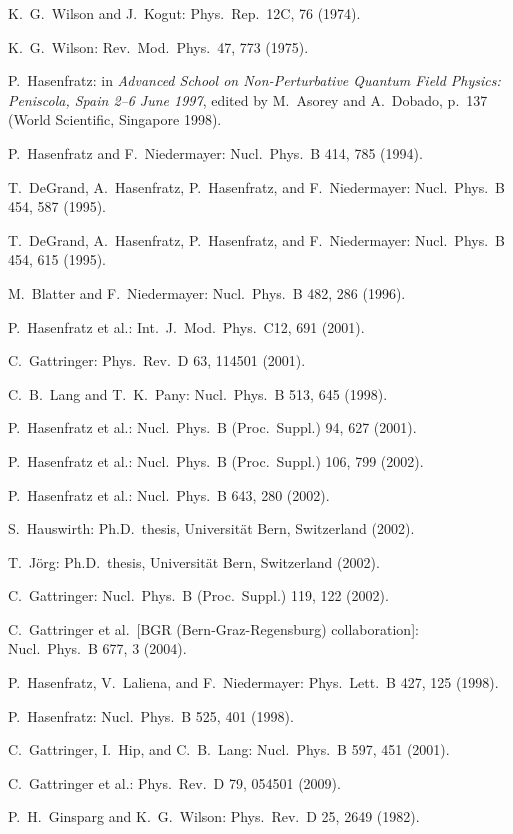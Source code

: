 \begin{enumerate}[label={[\arabic*]}]
  \item K.~G.~Wilson and J.~Kogut: Phys.\ Rep.\ 12C, 76 (1974).
  \item K.~G.~Wilson: Rev.\ Mod.\ Phys.\ 47, 773 (1975).
  \item P.~Hasenfratz: in \emph{Advanced School on Non-Perturbative Quantum
        Field Physics: Peniscola, Spain 2--6 June 1997}, edited by
        M.~Asorey and A.~Dobado, p.~137 (World Scientific, Singapore 1998).
  \item P.~Hasenfratz and F.~Niedermayer: Nucl.\ Phys.\ B 414, 785 (1994).
  \item T.~DeGrand, A.~Hasenfratz, P.~Hasenfratz, and F.~Niedermayer: Nucl.\ Phys.\ B 454, 587 (1995).
  \item T.~DeGrand, A.~Hasenfratz, P.~Hasenfratz, and F.~Niedermayer: Nucl.\ Phys.\ B 454, 615 (1995).
  \item M.~Blatter and F.~Niedermayer: Nucl.\ Phys.\ B 482, 286 (1996).
  \item P.~Hasenfratz et al.: Int.\ J.\ Mod.\ Phys.\ C12, 691 (2001).
  \item C.~Gattringer: Phys.\ Rev.\ D 63, 114501 (2001).
  \item C.~B.~Lang and T.~K.~Pany: Nucl.\ Phys.\ B 513, 645 (1998).
  \item P.~Hasenfratz et al.: Nucl.\ Phys.\ B (Proc.\ Suppl.) 94, 627 (2001).
  \item P.~Hasenfratz et al.: Nucl.\ Phys.\ B (Proc.\ Suppl.) 106, 799 (2002).
  \item P.~Hasenfratz et al.: Nucl.\ Phys.\ B 643, 280 (2002).
  \item S.~Hauswirth: Ph.D.\ thesis, Universit\"at Bern, Switzerland (2002).
  \item T.~J\"org: Ph.D.\ thesis, Universit\"at Bern, Switzerland (2002).
  \item C.~Gattringer: Nucl.\ Phys.\ B (Proc.\ Suppl.) 119, 122 (2002).
  \item C.~Gattringer et al.\ [BGR (Bern-Graz-Regensburg) collaboration]: Nucl.\ Phys.\ B 677, 3 (2004).
  \item P.~Hasenfratz, V.~Laliena, and F.~Niedermayer: Phys.\ Lett.\ B 427, 125 (1998).
  \item P.~Hasenfratz: Nucl.\ Phys.\ B 525, 401 (1998).
  \item C.~Gattringer, I.~Hip, and C.~B.~Lang: Nucl.\ Phys.\ B 597, 451 (2001).
  \item C.~Gattringer et al.: Phys.\ Rev.\ D 79, 054501 (2009).
  \item P.~H.~Ginsparg and K.~G.~Wilson: Phys.\ Rev.\ D 25, 2649 (1982).

\end{enumerate}
